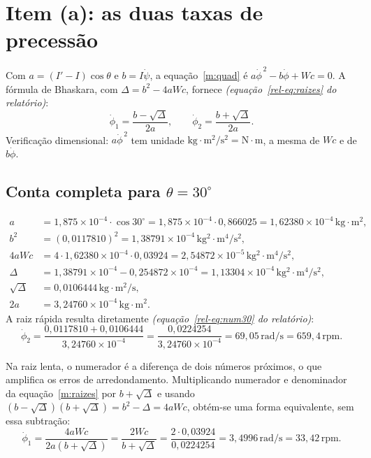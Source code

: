 \documentclass[11pt,a4paper]{article}
\newcommand{\un}[1]{\,\mathrm{#1}}
\newcommand{\phid}{\dot{\phi}}
\newcommand{\psid}{\dot{\psi}}
\newcommand{\rel}[1]{\textit{(equação~\ref*{rel-eq:#1} do relatório)}}
\begin{document}
\section{Item (a): as duas taxas de precessão}

Com $a=(I'-I)\cos\theta$ e $b=I\psid$, a equação~\ref{m:quad} é $a\phid^{\,2}-b\phid+Wc=0$. A fórmula de Bhaskara, com $\Delta=b^2-4aWc$, fornece \rel{raizes}:
\begin{equation}
\phid_1=\frac{b-\sqrt{\Delta}}{2a},\qquad\phid_2=\frac{b+\sqrt{\Delta}}{2a}.\label{m:raizes}
\end{equation}
Verificação dimensional: $a\phid^{\,2}$ tem unidade $\mathrm{kg\cdot m^2/s^2}=\mathrm{N\cdot m}$, a mesma de $Wc$ e de $b\phid$.

\subsection{Conta completa para $\theta=30^\circ$}

\begin{align}
a&=1,875\times10^{-4}\cdot\cos30^\circ=1,875\times10^{-4}\cdot0,866025=1,62380\times10^{-4}\un{kg\cdot m^2},\\
b^2&=(0,0117810)^2=1,38791\times10^{-4}\un{kg^2\cdot m^4/s^2},\\
4aWc&=4\cdot1,62380\times10^{-4}\cdot0,03924=2,54872\times10^{-5}\un{kg^2\cdot m^4/s^2},\\
\Delta&=1,38791\times10^{-4}-0,254872\times10^{-4}=1,13304\times10^{-4}\un{kg^2\cdot m^4/s^2},\\
\sqrt{\Delta}&=0,0106444\un{kg\cdot m^2/s},\\
2a&=3,24760\times10^{-4}\un{kg\cdot m^2}.
\end{align}
A raiz rápida resulta diretamente \rel{num30}:
\begin{equation}
\phid_2=\frac{0,0117810+0,0106444}{3,24760\times10^{-4}}=\frac{0,0224254}{3,24760\times10^{-4}}=69,05\un{rad/s}=659,4\un{rpm}.
\end{equation}

Na raiz lenta, o numerador é a diferença de dois números próximos, o que amplifica os erros de arredondamento. Multiplicando numerador e denominador da equação~\ref{m:raizes} por $b+\sqrt{\Delta}$ e usando $(b-\sqrt{\Delta})(b+\sqrt{\Delta})=b^2-\Delta=4aWc$, obtém-se uma forma equivalente, sem essa subtração:
\begin{equation}
\phid_1=\frac{4aWc}{2a\left(b+\sqrt{\Delta}\right)}=\frac{2Wc}{b+\sqrt{\Delta}}=\frac{2\cdot0,03924}{0,0224254}=3,4996\un{rad/s}=33,42\un{rpm}.\label{m:estavel}
\end{equation}
\end{document}

